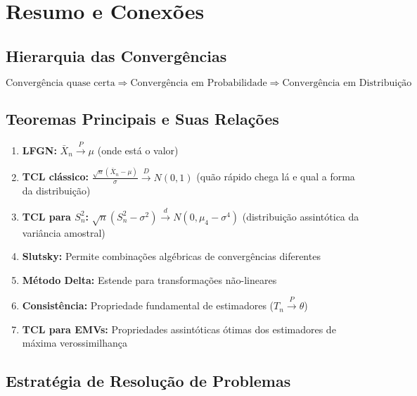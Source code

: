 \documentclass[12pt,a4paper]{article}
\theoremstyle{definition}
\theoremstyle{plain}
\begin{document}
\section{Resumo e Conexões}

\subsection{Hierarquia das Convergências}

\[
\text{Convergência quase certa} \Rightarrow \text{Convergência em Probabilidade} \Rightarrow \text{Convergência em Distribuição}
\]

\subsection{Teoremas Principais e Suas Relações}

\begin{enumerate}
    \item \textbf{LFGN:} $\bar{X}_n \xrightarrow{P} \mu$ (onde está o valor)
    
    \item \textbf{TCL clássico:} $\frac{\sqrt{n}(\bar{X}_n - \mu)}{\sigma} \xrightarrow{D} N(0,1)$ (quão rápido chega lá e qual a forma da distribuição)
    
    \item \textbf{TCL para $S_n^2$:} $\sqrt{n}(S_n^2 - \sigma^2) \xrightarrow{d} N(0, \mu_4 - \sigma^4)$ (distribuição assintótica da variância amostral)
    
    \item \textbf{Slutsky:} Permite combinações algébricas de convergências diferentes
    
    \item \textbf{Método Delta:} Estende para transformações não-lineares
    
    \item \textbf{Consistência:} Propriedade fundamental de estimadores ($T_n \xrightarrow{P} \theta$)
    
    \item \textbf{TCL para EMVs:} Propriedades assintóticas ótimas dos estimadores de máxima verossimilhança
\end{enumerate}

\subsection{Estratégia de Resolução de Problemas}
\end{document}
